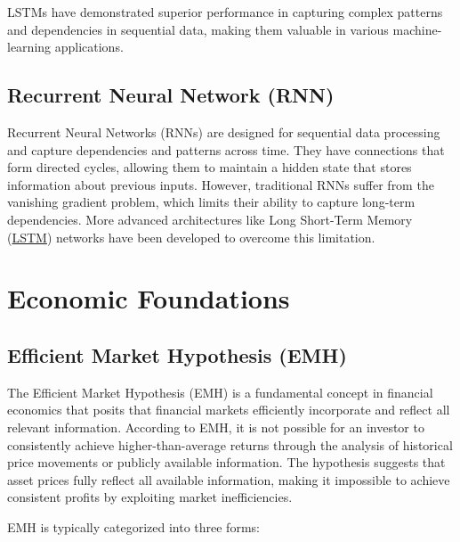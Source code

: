 \documentclass[a4paper,10pt]{article}
\begin{document}
LSTMs have demonstrated superior performance in capturing complex patterns and dependencies in sequential data, making them valuable in various machine-learning applications.


\subsection{Recurrent Neural Network (RNN)}\label{appx:rnn}

Recurrent Neural Networks (RNNs) are designed for sequential data processing and capture dependencies and patterns across time. They have connections that form directed cycles, allowing them to maintain a hidden state that stores information about previous inputs. However, traditional RNNs suffer from the vanishing gradient problem, which limits their ability to capture long-term dependencies. More advanced architectures like Long Short-Term Memory (\hyperref[appx:lstm]{LSTM}) networks have been developed to overcome this limitation.

\section{Economic Foundations}

\subsection{Efficient Market Hypothesis (EMH)}\label{appx:emh}

The Efficient Market Hypothesis (EMH) is a fundamental concept in financial economics that posits that financial markets efficiently incorporate and reflect all relevant information. According to EMH, it is not possible for an investor to consistently achieve higher-than-average returns through the analysis of historical price movements or publicly available information. The hypothesis suggests that asset prices fully reflect all available information, making it impossible to achieve consistent profits by exploiting market inefficiencies.

EMH is typically categorized into three forms:
\end{document}
